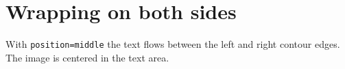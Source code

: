 \documentclass{article}
\begin{document}
\section*{Wrapping on both sides}

With \texttt{position=middle} the text flows between the left and
right contour edges. The image is centered in the text area.

\lipsum[1-4]
\end{document}
